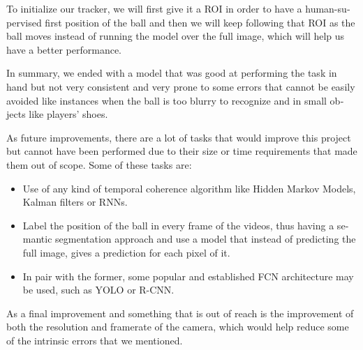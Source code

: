 \begin{otherlanguage}{english}
To initialize our tracker, we will first give it a ROI in order to have a human-supervised first position of the ball and then we will keep following that ROI as the ball moves instead of running the model over the full image, which will help us have a better performance.


In summary, we ended with a model that was good at performing the task in hand but not very consistent and very prone to some errors that cannot be easily avoided like instances when the ball is too blurry to recognize and in small objects like players’ shoes.

As future improvements, there are a lot of tasks that would improve this project but cannot have been performed due to their size or time requirements that made them out of scope. Some of these tasks are:

\begin{itemize}
    \item Use of any kind of temporal coherence algorithm like Hidden Markov Models, Kalman filters or RNNs.
    \item Label the position of the ball in every frame of the videos, thus having a semantic segmentation approach and use a model that instead of predicting the full image, gives a prediction for each pixel of it.
    \item In pair with the former, some popular and established FCN architecture may be used, such as YOLO or R-CNN.
\end{itemize}

As a final improvement and something that is out of reach is the improvement of both the resolution and framerate of the camera, which would help reduce some of the intrinsic errors that we mentioned.

\end{otherlanguage}
\newpage